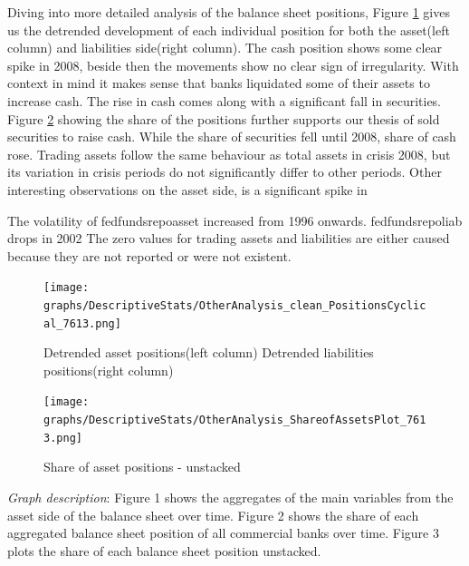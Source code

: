 \documentclass[12pt, a4paper]{article} %
\begin{document}
Diving into more detailed analysis of the balance sheet positions, Figure \ref{fig:positions} gives us the detrended development of each individual position for both the asset(left column) and liabilities side(right column).
The cash position shows some clear spike in 2008, beside then the movements show no clear sign of irregularity. With context in mind it makes sense that banks liquidated some of their assets to increase cash. The rise in cash comes along with a significant fall in securities. Figure \ref{fig:sharepositions} showing the share of the positions further supports our thesis of sold securities to raise cash. While the share of securities fell until 2008, share of cash rose.
Trading assets follow the same behaviour as total assets in crisis 2008, but its variation in crisis periods do not significantly differ to other periods.  
Other interesting observations on the asset side, is a significant spike in

The volatility of fedfundsrepoasset increased from 1996 onwards. 
fedfundsrepoliab drops in 2002
The zero values for trading assets and liabilities are either caused because they are not reported or were not existent. 

\begin{figure}[hbtp]
\centering
\caption{Detrended asset positions(left column) \hspace{2cm} Detrended liabilities positions(right column)}
\texttt{[image: graphs/DescriptiveStats/OtherAnalysis\_clean\_PositionsCyclical\_7613.png]}
\label{fig:positions}
\end{figure}


\begin{figure}[hbtp]
\centering
\caption{Share of asset positions - unstacked}
\texttt{[image: graphs/DescriptiveStats/OtherAnalysis\_ShareofAssetsPlot\_7613.png]}
\label{fig:sharepositions}
\end{figure}


\noindent \textit{Graph description}: Figure 1 shows the aggregates of the main variables from the asset side of the balance sheet over time. Figure 2 shows the share of each aggregated balance sheet position of all commercial banks over time. Figure 3 plots the share of each balance sheet position unstacked.\\
\end{document}
